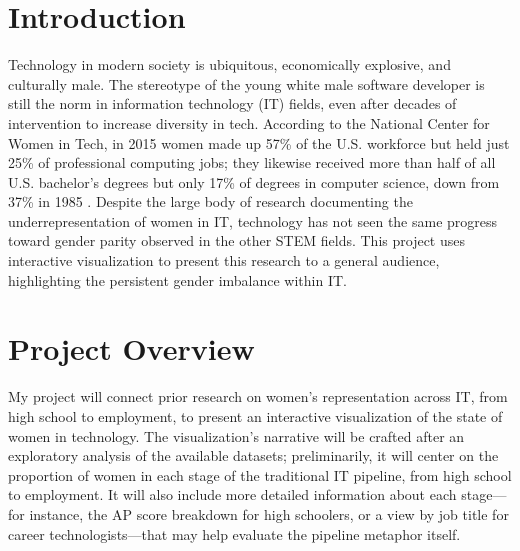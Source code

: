 \documentclass{article}
\begin{document}
\section{Introduction}
Technology in modern society is ubiquitous, economically explosive, and culturally male. The stereotype of the young white male software developer is still the norm in information technology (IT) fields, even after decades of intervention to increase diversity in tech. According to the National Center for Women in Tech, in 2015 women made up 57\% of the U.S. workforce but held just 25\% of professional computing jobs; they likewise received more than half of all U.S. bachelor's degrees but only 17\% of degrees in computer science, down from 37\% in 1985 \citep{NCWIT2016Women}. Despite the large body of research documenting the underrepresentation of women in IT, technology has not seen the same progress toward gender parity observed in the other STEM fields. This project uses interactive visualization to present this research to a general audience, highlighting the persistent gender imbalance within IT\@.



\section{Project Overview}
My project will connect prior research on women’s representation across IT, from high school to employment, to present an interactive visualization of the state of women in technology. The visualization’s narrative will be crafted after an exploratory analysis of the available datasets; preliminarily, it will center on the proportion of women in each stage of the traditional IT pipeline, from high school to employment. It will also include more detailed information about each stage---for instance, the AP score breakdown for high schoolers, or a view by job title for career technologists---that may help evaluate the pipeline metaphor itself.









\end{document}
